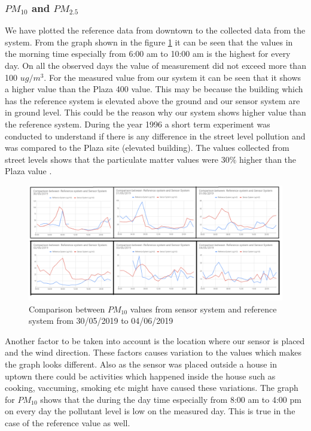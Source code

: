  \subsubsection{$PM_{10}$ and $PM_{2.5}$}
We have plotted the reference data from downtown to the collected data from the system. From the graph shown in the figure \ref{PM10} it can be seen that the values in the morning time especially from 6:00 am to 10:00 am is the highest for every day. On all the observed days the value of measurement did not exceed more than 100 $ug/m^3$. For the measured value from our system it can be seen that it shows a higher value than the Plaza 400 value. %
This may be because the building which has the reference system is elevated above the ground and our sensor system are in ground level. This could be the reason why our system shows higher value than the reference system.
 During the year 1996 a short term experiment was conducted to understand if there is any difference in the street level pollution and was compared to the Plaza site (elevated building). The values collected from street levels shows that the particulate matter values were 30$\%$ higher than the Plaza value \cite{Environment2010}. 

 
 \begin{figure}[h]
  \begin{center}
  \includegraphics[scale=0.70]{images/figure25.png}
  \end{center}
  \caption{Comparison between $PM_{10}$ values from sensor system and reference system from 30/05/2019 to 04/06/2019}
\label{PM10}
\end{figure}
\bigskip


  Another factor to be taken into account is  the location where our sensor is placed and the wind direction. These factors causes variation to the values which makes the graph looks different. Also as the sensor was placed outside a house in uptown there could be activities which happened inside the house such as cooking, vaccuming, smoking etc might have caused these variations. %
 The graph for $PM_{10}$ shows that the during the day time especially from 8:00 am to 4:00 pm on every day the pollutant level is low on the measured day. This is true in the case of the reference value as well.

